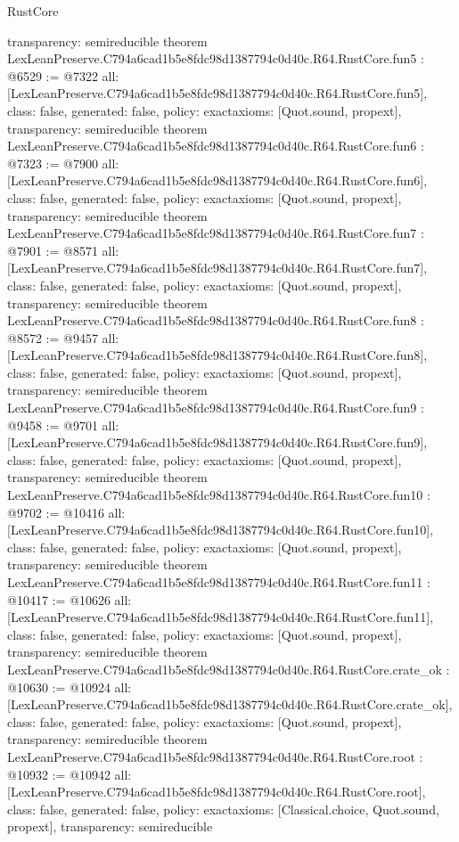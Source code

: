\begin{lexlean}{RustCore}
\begin{coremodule}
{  transparency: semireducible
}
theorem LexLeanPreserve.C794a6cad1b5e8fdc98d1387794c0d40c.R64.RustCore.fun5 : @6529 := @7322 {
  all: [LexLeanPreserve.C794a6cad1b5e8fdc98d1387794c0d40c.R64.RustCore.fun5],
  class: false,
  generated: false,
  policy: exact{axioms: [Quot.sound, propext]},
  transparency: semireducible
}
theorem LexLeanPreserve.C794a6cad1b5e8fdc98d1387794c0d40c.R64.RustCore.fun6 : @7323 := @7900 {
  all: [LexLeanPreserve.C794a6cad1b5e8fdc98d1387794c0d40c.R64.RustCore.fun6],
  class: false,
  generated: false,
  policy: exact{axioms: [Quot.sound, propext]},
  transparency: semireducible
}
theorem LexLeanPreserve.C794a6cad1b5e8fdc98d1387794c0d40c.R64.RustCore.fun7 : @7901 := @8571 {
  all: [LexLeanPreserve.C794a6cad1b5e8fdc98d1387794c0d40c.R64.RustCore.fun7],
  class: false,
  generated: false,
  policy: exact{axioms: [Quot.sound, propext]},
  transparency: semireducible
}
theorem LexLeanPreserve.C794a6cad1b5e8fdc98d1387794c0d40c.R64.RustCore.fun8 : @8572 := @9457 {
  all: [LexLeanPreserve.C794a6cad1b5e8fdc98d1387794c0d40c.R64.RustCore.fun8],
  class: false,
  generated: false,
  policy: exact{axioms: [Quot.sound, propext]},
  transparency: semireducible
}
theorem LexLeanPreserve.C794a6cad1b5e8fdc98d1387794c0d40c.R64.RustCore.fun9 : @9458 := @9701 {
  all: [LexLeanPreserve.C794a6cad1b5e8fdc98d1387794c0d40c.R64.RustCore.fun9],
  class: false,
  generated: false,
  policy: exact{axioms: [Quot.sound, propext]},
  transparency: semireducible
}
theorem LexLeanPreserve.C794a6cad1b5e8fdc98d1387794c0d40c.R64.RustCore.fun10 : @9702 := @10416 {
  all: [LexLeanPreserve.C794a6cad1b5e8fdc98d1387794c0d40c.R64.RustCore.fun10],
  class: false,
  generated: false,
  policy: exact{axioms: [Quot.sound, propext]},
  transparency: semireducible
}
theorem LexLeanPreserve.C794a6cad1b5e8fdc98d1387794c0d40c.R64.RustCore.fun11 : @10417 := @10626 {
  all: [LexLeanPreserve.C794a6cad1b5e8fdc98d1387794c0d40c.R64.RustCore.fun11],
  class: false,
  generated: false,
  policy: exact{axioms: [Quot.sound, propext]},
  transparency: semireducible
}
theorem LexLeanPreserve.C794a6cad1b5e8fdc98d1387794c0d40c.R64.RustCore.crate_ok : @10630 := @10924 {
  all: [LexLeanPreserve.C794a6cad1b5e8fdc98d1387794c0d40c.R64.RustCore.crate_ok],
  class: false,
  generated: false,
  policy: exact{axioms: [Quot.sound, propext]},
  transparency: semireducible
}
theorem LexLeanPreserve.C794a6cad1b5e8fdc98d1387794c0d40c.R64.RustCore.root : @10932 := @10942 {
  all: [LexLeanPreserve.C794a6cad1b5e8fdc98d1387794c0d40c.R64.RustCore.root],
  class: false,
  generated: false,
  policy: exact{axioms: [Classical.choice, Quot.sound, propext]},
  transparency: semireducible
}


\end{coremodule}
\end{lexlean}
